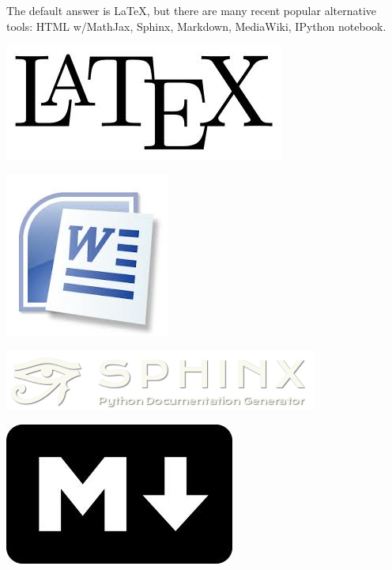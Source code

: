 \documentclass[%
twoside,                 %
final,                   %
chapterprefix=true,      %
open=right               %
10pt]{book}
\newenvironment{graybox1admon}[1][]{
\begin{graybox1mdframed}[frametitle=#1]
}
{
\end{graybox1mdframed}
}
\begin{document}
\noindent

\begin{graybox1admon}[]
The default answer is {\LaTeX}, but there are many
recent popular alternative tools: HTML w/MathJax,
Sphinx, Markdown, MediaWiki, IPython notebook.
\end{graybox1admon}





\begin{center}  %
  \centerline{\includegraphics[width=0.3\linewidth]{fig/LaTeX_logo.jpg}}
\end{center}



\begin{center}  %
  \centerline{\includegraphics[width=0.2\linewidth]{fig/MS_Word_logo.jpg}}
\end{center}



\begin{center}  %
  \centerline{\includegraphics[width=0.4\linewidth]{fig/sphinx_logo.png}}
\end{center}



\begin{center}  %
  \centerline{\includegraphics[width=0.2\linewidth]{fig/markdown_logo.jpg}}
\end{center}
\end{document}
